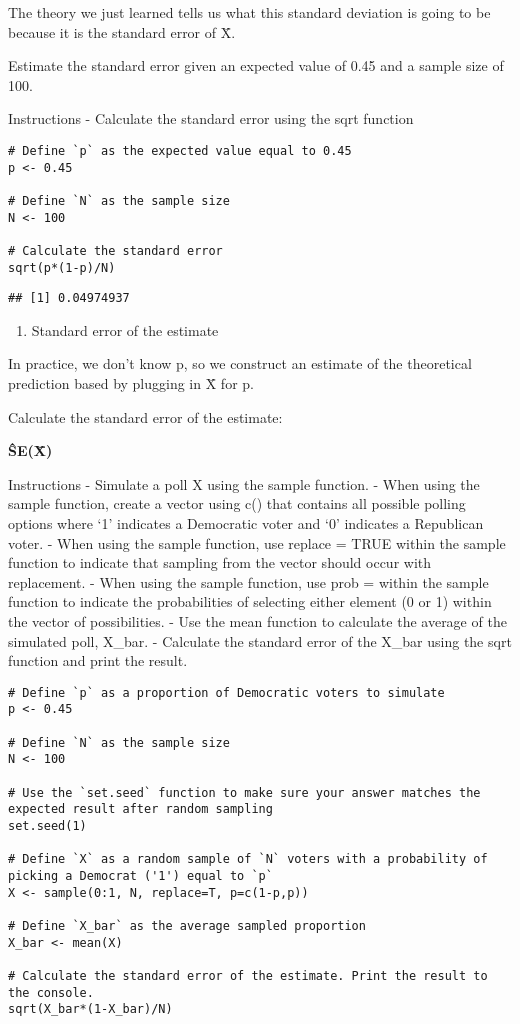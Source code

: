\documentclass[
]{article}
\providecommand{\tightlist}{%
  \setlength{\itemsep}{0pt}\setlength{\parskip}{0pt}}
\begin{document}
The theory we just learned tells us what this standard deviation is
going to be because it is the standard error of X̄.

Estimate the standard error given an expected value of 0.45 and a sample
size of 100.

Instructions - Calculate the standard error using the sqrt function

\begin{verbatim}
# Define `p` as the expected value equal to 0.45
p <- 0.45

# Define `N` as the sample size
N <- 100

# Calculate the standard error
sqrt(p*(1-p)/N)
\end{verbatim}

\begin{verbatim}
## [1] 0.04974937
\end{verbatim}

\begin{enumerate}
\def\labelenumi{\arabic{enumi}.}
\setcounter{enumi}{6}
\tightlist
\item
  Standard error of the estimate
\end{enumerate}

In practice, we don't know p, so we construct an estimate of the
theoretical prediction based by plugging in X̄ for p.

Calculate the standard error of the estimate:

\textbf{ŜE(X̄)}

Instructions - Simulate a poll X using the sample function. - When using
the sample function, create a vector using c() that contains all
possible polling options where `1' indicates a Democratic voter and `0'
indicates a Republican voter. - When using the sample function, use
replace = TRUE within the sample function to indicate that sampling from
the vector should occur with replacement. - When using the sample
function, use prob = within the sample function to indicate the
probabilities of selecting either element (0 or 1) within the vector of
possibilities. - Use the mean function to calculate the average of the
simulated poll, X\_bar. - Calculate the standard error of the X\_bar
using the sqrt function and print the result.

\begin{verbatim}
# Define `p` as a proportion of Democratic voters to simulate
p <- 0.45

# Define `N` as the sample size
N <- 100

# Use the `set.seed` function to make sure your answer matches the expected result after random sampling
set.seed(1)

# Define `X` as a random sample of `N` voters with a probability of picking a Democrat ('1') equal to `p`
X <- sample(0:1, N, replace=T, p=c(1-p,p))

# Define `X_bar` as the average sampled proportion
X_bar <- mean(X)

# Calculate the standard error of the estimate. Print the result to the console.
sqrt(X_bar*(1-X_bar)/N)
\end{verbatim}
\end{document}
